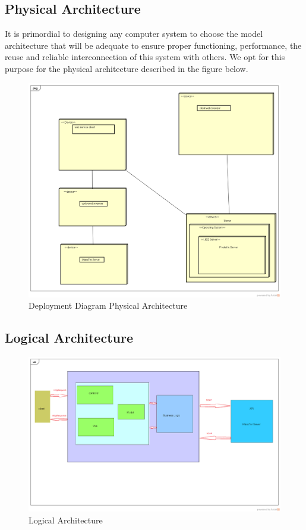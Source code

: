 \documentclass[12pt]{article}
\begin{document}
	\subsection{Physical Architecture}
	It is primordial to designing any computer system to choose the model architecture that will be adequate to ensure proper functioning, performance, the reuse and reliable interconnection of this system with others. We opt for this purpose for the physical architecture described in the figure below.
	\begin{figure}[h]
		\centering
		\includegraphics[width=1\textwidth]{DeploymentDiagramPhysicalArchitecture.png}
		\caption{Deployment Diagram Physical Architecture}
	\end{figure}  

	\clearpage
    \newpage  
	
	\subsection{Logical Architecture}
		\begin{figure}[h]
		\centering
		\includegraphics[width=1\textwidth]{logicalArchitecture.png}
		\caption{Logical Architecture}
	\end{figure}  
	
\end{document}
